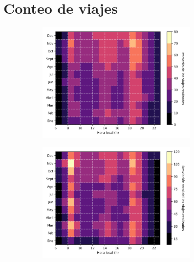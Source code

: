 \section{Conteo de viajes}

\begin{figure}[H]
    \centering
    \begin{subfigure}[b]{8cm}
        \includegraphics[width=8cm]{Graphics/monthly_hourly_mean_count_travel.png}
    \end{subfigure}
    \begin{subfigure}[b]{8cm}
        \includegraphics[width=8cm]{Graphics/monthly_hourly_var_count_travel.png}
    \end{subfigure}
\end{figure}

